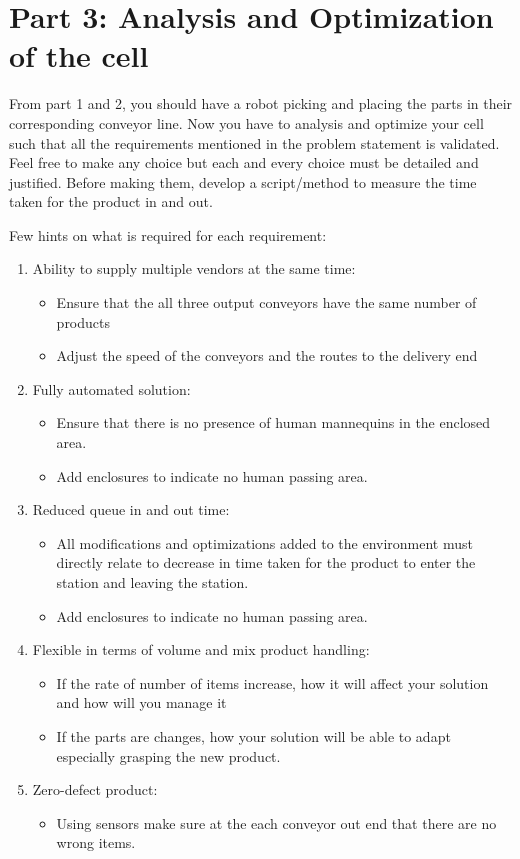 \documentclass[12pt, a4paper]{article}
\begin{document}
\section*{Part 3: Analysis and Optimization of the cell} %
From part 1 and 2, you should have a robot picking and placing the parts in their corresponding conveyor line. Now you have to analysis and optimize your cell such that all the requirements mentioned in the problem statement is validated. Feel free to make any choice but each and every choice must be detailed and justified. Before making them, develop a script/method to measure the time taken for the product in and out.

Few hints on what is required for each requirement:
\begin{enumerate}
    \item Ability to supply multiple vendors at the same time:
        \begin{itemize}
            \item Ensure that the all three output conveyors have the same number of products
            \item Adjust the speed of the conveyors and the routes to the delivery end
        \end{itemize}
    \item Fully automated solution:
        \begin{itemize}
            \item Ensure that there is no presence of human mannequins in the enclosed area.
            \item Add enclosures to indicate no human passing area. 
        \end{itemize}
    \item Reduced queue in and out time:
        \begin{itemize}
            \item All modifications and optimizations added to the environment must directly relate to decrease in time taken for the product to enter the station and leaving the station.
            \item Add enclosures to indicate no human passing area. 
        \end{itemize}
    \item Flexible in terms of volume and mix product handling:
        \begin{itemize}
            \item If the rate of number of items increase, how it will affect your solution and how will you manage it
            \item If the parts are changes, how your solution will be able to adapt especially grasping the new product.
        \end{itemize}
    \item Zero-defect product:
        \begin{itemize}
            \item Using sensors make sure at the each conveyor out end that there are no wrong items. 
        \end{itemize}
\end{enumerate}
\end{document}
